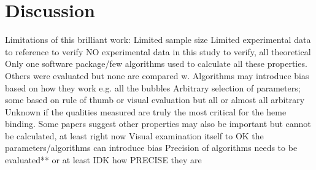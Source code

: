 \chapter{Discussion}

	Limitations of this brilliant work:
	Limited sample size
	Limited experimental data to reference to verify
	NO experimental data in this study to verify, all theoretical
	Only one software package/few algorithms used to calculate all these properties. Others were evaluated but none are compared w.
	Algorithms may introduce bias based on how they work e.g. all the bubbles
	Arbitrary selection of parameters; some based on rule of thumb or visual evaluation but all or almost all arbitrary
	Unknown if the qualities measured are truly the most critical for the heme binding. Some papers suggest other properties may also be important but cannot be calculated, at least right now
	Visual examination itself to OK the parameters/algorithms can introduce bias
	Precision of algorithms needs to be evaluated** or at least IDK how PRECISE they are